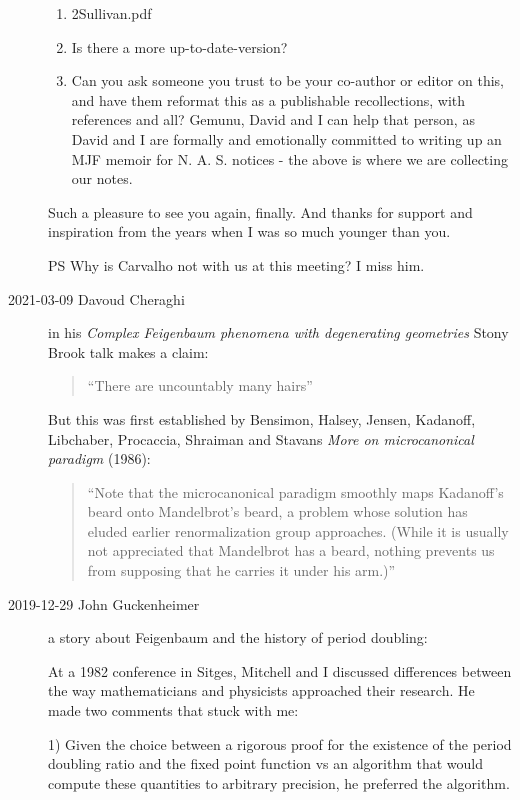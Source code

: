 \begin{description}
\begin{enumerate}
  \item {}
        {2Sullivan.pdf}
  \item Is there a more up-to-date-version?
  \item Can you ask someone you trust to be your co-author or editor
        on this, and have them reformat this as a publishable
        recollections, with references and all? Gemunu, David and I can
        help that person, as David and I are formally and emotionally
        committed to writing up an MJF memoir for N. A. S. notices - the
        above is where we are collecting our notes.
\end{enumerate}

Such a pleasure to see you again, finally. And thanks for support and
inspiration from the years when I was so much younger than you.

PS Why is Carvalho not with us at this meeting? I miss him.

\item[2021-03-09 Davoud Cheraghi] in his
{\em Complex Feigenbaum phenomena with degenerating geometries}
 {Stony Brook talk}
makes a claim:
\begin{quote}
``There are uncountably many hairs''
\end{quote}
But this was first established by Bensimon, Halsey, Jensen, Kadanoff,
Libchaber, Procaccia, Shraiman and Stavans {\em More on
microcanonical paradigm} (1986):

\begin{quote}
``Note that the microcanonical paradigm smoothly maps Kadanoff's beard onto
Mandelbrot's beard, a problem whose solution has eluded earlier
renormalization group approaches. (While it is usually not appreciated
that Mandelbrot has a beard, nothing prevents us from supposing that he
carries it under his arm.)''
\end{quote}


\item[2019-12-29 John Guckenheimer]  %
a story about Feigenbaum and the history of period doubling:

At a 1982 conference in Sitges, Mitchell and I discussed differences
between the way mathematicians and physicists approached their research.
He made two comments that stuck with me:

1) Given the choice between a rigorous proof for the existence of the
period doubling ratio and the fixed point function vs an algorithm that
would compute these quantities to arbitrary precision, he preferred the
algorithm.


\end{description}
